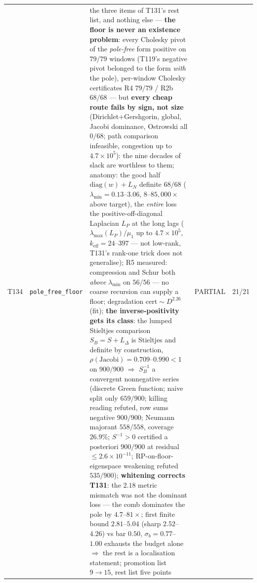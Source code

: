 \documentclass[11pt,a4paper]{article}
\begin{document}
{\begin{xltabular}{\linewidth}{@{}p{0.95cm} >{\raggedright\arraybackslash}p{3.1cm} Y >{\raggedright\scriptsize\arraybackslash}p{3.35cm} p{1.15cm}@{}}
T134 & \texttt{\scriptsize pole\_\allowbreak free\_\allowbreak floor} & the three items of T131's rest list, and nothing else --- \textbf{the floor is never an existence problem}: every Cholesky pivot of the \emph{pole-free} form positive on $79/79$ windows (T119's negative pivot belonged to the form \emph{with} the pole), per-window Cholesky certificates R4 $79/79$ / R2b $68/68$ --- but \textbf{every cheap route fails by sign, not size} (Dirichlet+Gershgorin, global, Jacobi dominance, Ostrowski all $0/68$; path comparison infeasible, congestion up to $4.7\times10^{5}$): the nine decades of slack are worthless to them; anatomy: the good half $\mathrm{diag}(w)+L_N$ definite $68/68$ ($\lambda_{\min}=0.13$--$3.06$, $8$--$85{,}000\times$ above target), the \emph{entire} loss the positive-off-diagonal Laplacian $L_P$ at the long lags ($\lambda_{\max}(L_P)/\mu_1$ up to $4.7\times10^{5}$, $k_{\mathrm{eff}}=24$--$397$ --- not low-rank, T131's rank-one trick does not generalise); R5 measured: compression and Schur both \emph{above} $\lambda_{\min}$ on $56/56$ --- no coarse recursion can supply a floor; degradation $\mathrm{cert}\sim D^{2.26}$ (fit); \textbf{the inverse-positivity gets its class}: the lumped Stieltjes comparison $S_B=S+L_\Delta$ is Stieltjes and definite by construction, $\rho(\mathrm{Jacobi})=0.709$--$0.990<1$ on $900/900$ $\Rightarrow$ $S_B^{-1}$ a convergent nonnegative series (discrete Green function; naive split only $659/900$; killing reading refuted, row sums negative $900/900$; Neumann majorant $558/558$, coverage $26.9\%$; $S^{-1}>0$ certified a posteriori $900/900$ at residual $\le2.6\times10^{-11}$; RP-on-floor-eigenspace weakening refuted $535/900$); \textbf{whitening corrects T131}: the $2.18$ metric mismatch was not the dominant loss --- the comb dominates the pole by $4.7$--$81\times$; first finite bound $2.81$--$5.04$ (sharp $2.52$--$4.26$) vs bar $0.50$, $\sigma_b=0.77$--$1.00$ exhausts the budget alone $\Rightarrow$ the rest is a localisation statement; promotion list $9\to15$, rest list five points & PARTIAL & 21/21\\

\end{xltabular}}
\end{document}
